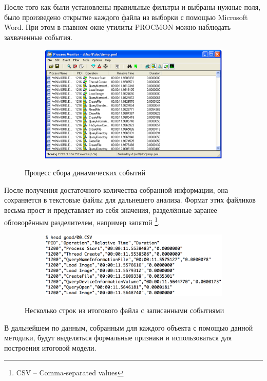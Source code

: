 После того как были установлены правильные фильтры и выбраны нужные поля, было произведено открытие каждого файла из выборки с помощью Microsoft Word.
При этом в главном окне утилиты PROCMON можно наблюдать захваченные события.

\begin{figure}[ht]
	\centering
    \begin{subfigure}[b]{1\textwidth}
    \centering
        \includegraphics[scale=0.5]{procmon_events.png}        
    \end{subfigure}
 
    \caption{Процесс сбора динамических событий}
    \label{fig_parsetree}
\end{figure}

\newpage
После получения достаточного количества собранной информации, она сохраняется в текстовые файлы для дальнешего анализа.
Формат этих файликов весьма прост и представляет из себя значения, разделённые заранее обговорённым разделителем, например запятой \footnote{CSV -- Comma-separated values}.

\begin{figure}[ht]
	\centering
    \begin{subfigure}[b]{1\textwidth}
    \centering
        \includegraphics[scale=0.5]{csv.png}        
    \end{subfigure}
 
    \caption{Несколько строк из итогового файла с записанными событиями}
    \label{fig_parsetree}
\end{figure}

В дальнейшем по данным, собранным для каждого объекта с помощью данной методики, будут выделяться формальные признаки и использоваться для построения итоговой модели.